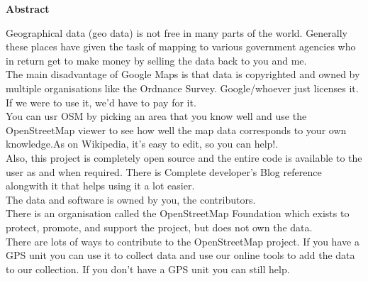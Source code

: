 \begin{center}
{\Huge \bf{Abstract}\vskip 0.2in}
\end{center}

Geographical data (geo data) is not free in many parts of the world. Generally these places have given the task of mapping to various government agencies who in return get to make money by selling the data back to you and me.\\
The main disadvantage of Google Maps is that data is copyrighted and owned by multiple organisations like the Ordnance Survey. Google/whoever just licenses it. If we were to use it, we'd have to pay for it.\\
You can usr OSM by picking an area that you know well and use the OpenStreetMap viewer to see how well the map data corresponds to your own knowledge.As on Wikipedia, it's easy to edit, so you can help!.\\ 

Also, this project is completely open source and the entire code is available
to the user as and when required. There is Complete developer's
Blog reference  alongwith it that helps using it a lot easier.\\
 The data and software is owned by you, the contributors.\\

There is an organisation called the OpenStreetMap Foundation which exists to protect, promote, and support the project, but does not own the data. \\
There are lots of ways to contribute to the OpenStreetMap project. If you have a GPS unit you can use it to collect data and use our online tools to add the data to our collection. If you don't have a GPS unit you can still help.\\ 
